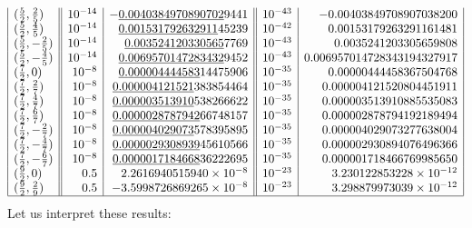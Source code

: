 \documentclass[12pt, a4paper]{article}
\begin{document}
\begin{align}
\begin{array}{|l||r|r||r|r|}
(\frac52,\frac25) &    10^{-14} &  -\underline{0.0040384970890702}9441 &  10^{-43} &  -0.00403849708907038200 \\
(\frac52,\frac45) &    10^{-14} &  \underline{0.001531792632911}45239 &  10^{-42} &  0.00153179263291161481 \\
(\frac52,-\frac25) &    10^{-14} &  \underline{0.003524120330565}7769 &  10^{-43} &  0.0035241203305659808 \\
(\frac52,-\frac45) &    10^{-14} & \underline{0.0069570147283432}9452 &  10^{-43} & 0.006957014728343194327917 \\
(\frac72,0) &    10^{-8} &  \underline{0.000004444583}14475906 &  10^{-35} &  0.00000444458367504768 \\
(\frac72,\frac27) &    10^{-8} &  \underline{0.000004121521}383854464 &   10^{-35} &  0.000004121520804451911 \\
(\frac72,\frac47) &    10^{-8} &  \underline{0.000003513910}538266622 &  10^{-35} &  0.000003513910885535083 \\
(\frac72,\frac67) &    10^{-8} &  \underline{0.0000028787942}66748157 &  10^{-35} &  0.000002878794192189494 \\
(\frac72,-\frac27) &    10^{-8} &  \underline{0.000004029073}578395895 &   10^{-35} &  0.000004029073277638004 \\
(\frac72,-\frac47) &    10^{-8} &  \underline{0.0000029308939}45610566 &   10^{-35} &  0.000002930894076496366 \\
(\frac72,-\frac67) &    10^{-8} &  \underline{0.0000017184668}36222695 &  10^{-35} &  0.000001718466769985650\\
(\frac92,0) &    0.5 &  2.2616940515940\times 10^{-8} &  10^{-23} &  3.230122853228 \times 10^{-12}\\
(\frac92,\frac29) &    0.5  & -3.5998726869265\times 10^{-8} &  10^{-23} &  3.298879973039\times 10^{-12} \\
\hline 
\end{array}
\end{align}
Let us interpret these results:
\end{document}
